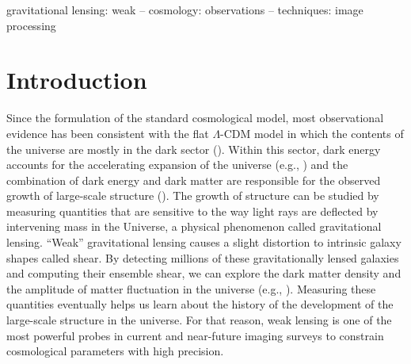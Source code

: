 \documentclass[fleqn,usenatbib]{mnras}
\begin{document}
\begin{keywords}
gravitational lensing: weak -- cosmology: observations -- techniques: image processing
\end{keywords}



\section{Introduction}

Since the formulation of the standard cosmological model, most observational evidence has been consistent with the flat $\Lambda$-CDM model in which the contents of the universe are mostly in the dark sector (\citealt{2020A&A...641A...8P, 2020MNRAS.498.2492G, 2020MNRAS.499.5527T, 2021A&A...645A.104A, 2022PhRvD.105b3520A, 2022arXiv220204077B}). Within this sector, dark energy accounts for the accelerating expansion of the universe (e.g., \citealt{1998AJ....116.1009R, 1999AIPC..478..129P}) and the combination of dark energy and dark matter are responsible for the observed growth of large-scale structure (\citealt{2015RPPh...78h6901K, 2017grle.book.....D}). The growth of structure can be studied by measuring quantities that are sensitive to the way light rays are deflected by intervening mass in the Universe, a physical phenomenon called gravitational lensing. “Weak” gravitational lensing causes a slight distortion to intrinsic galaxy shapes called shear. By detecting millions of these gravitationally lensed galaxies and computing their ensemble shear, we can explore the dark matter density and the amplitude of matter fluctuation in the universe (e.g., \citealt{2001PhR...340..291B}). Measuring these quantities eventually helps us learn about the history of the development of the large-scale structure in the universe. For that reason, weak lensing is one of the most powerful probes in current and near-future imaging surveys to constrain cosmological parameters with high precision. 
\end{document}
